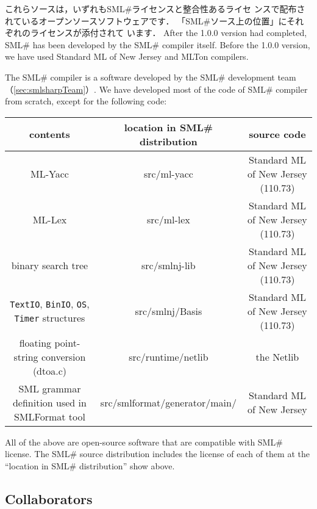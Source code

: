 \documentclass{jbook}
\newcommand{\txt}[2]{#2}
\newcommand{\smlsharp}{SML\#}
\newcommand{\version}{1.0.0}
\begin{document}
	これらソースは，いずれも\smlsharp{}ライセンスと整合性あるライセ
ンスで配布されているオープンソースソフトウェアです．
	「\smlsharp{}ソース上の位置」にそれぞれのライセンスが添付されて
います．
\else%
	After the \version{} version had completed, \smlsharp{} has been
developed by the \smlsharp{} compiler itself.
	Before the \version{} version, we have used Standard ML of New
Jersey and MLTon compilers.

	The \smlsharp{} compiler is a software developed by the
\smlsharp{} development team （\ref{sec:smlsharpTeam}）.
	We have developed most of the code of \smlsharp{} compiler from
scratch, except for the following code:

\begin{center}
\begin{tabular}{|c|c|c|}
\hline
contents & location in \smlsharp{} distribution & source code
\\\hline
ML-Yacc & src/ml-yacc  & Standard ML of New Jersey (110.73)
\\\hline
ML-Lex & src/ml-lex  & Standard ML of New Jersey (110.73)
\\\hline
binary search tree & src/smlnj-lib &  Standard ML of New Jersey (110.73)
\\\hline
{\tt TextIO},
{\tt BinIO},
{\tt OS},
{\tt Timer}
structures
&
src/smlnj/Basis
&
Standard ML of New Jersey (110.73)
\\\hline
floating point-string conversion
(dtoa.c)
&
src/runtime/netlib
&
the Netlib
\\\hline
SML grammar definition used 
in SMLFormat tool
&
src/smlformat/generator/main/
&
Standard ML of New Jersey
\\\hline
\end{tabular}
\end{center}

	All of the above are open-source software that are compatible
with \smlsharp{} license.
	The \smlsharp{} source distribution includes the license of each
of them at the ``location in \smlsharp{} distribution'' show above.
\fi%

\subsection{\txt{研究開発協力者}{Collaborators}}
\end{document}
